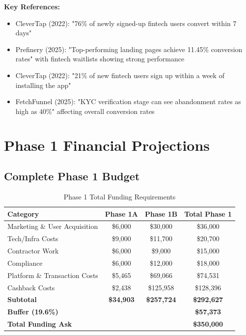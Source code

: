 \documentclass[11pt,letterpaper]{article}
\begin{document}
\vspace{0.5em}

\textbf{Key References:}
\begin{itemize}
\item[\textsuperscript{a}] CleverTap (2022): "76\% of newly signed-up fintech users convert within 7 days"
\item[\textsuperscript{b}] Prefinery (2025): "Top-performing landing pages achieve 11.45\% conversion rates" with fintech waitlists showing strong performance
\item[\textsuperscript{c}] CleverTap (2022): "21\% of new fintech users sign up within a week of installing the app"
\item[\textsuperscript{d}] FetchFunnel (2025): "KYC verification stage can see abandonment rates as high as 40\%" affecting overall conversion rates
\end{itemize}

\newpage

\section{Phase 1 Financial Projections}

\subsection{Complete Phase 1 Budget}

\begin{table}[h]
\centering
\caption{Phase 1 Total Funding Requirements}
\begin{tabular}{|l|c|c|c|}
\hline
\textbf{Category} & \textbf{Phase 1A} & \textbf{Phase 1B} & \textbf{Total Phase 1} \\
\hline
Marketing \& User Acquisition & \$6,000& \$30,000 & \$36,000\\
Tech/Infra Costs & \$9,000& \$11,700& \$20,700\\
Contractor Work & \$6,000& \$9,000 & \$15,000 \\
Compliance & \$6,000& \$12,000 & \$18,000 \\
Platform \& Transaction Costs & \$5,465& \$69,066& \$74,531\\
Cashback Costs & \$2,438& \$125,958& \$128,396\\
\textbf{Subtotal} & \textbf{\$34,903}& \textbf{\$257,724} & \textbf{\$292,627}\\
\textbf{Buffer (19.6\%)} & & & \textbf{\$57,373}\\
\textbf{Total Funding Ask} & & & \textbf{\$350,000}\\
\hline
\end{tabular}
\end{table}
\end{document}
